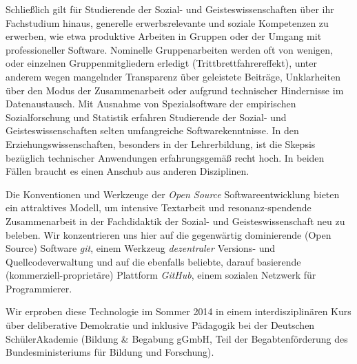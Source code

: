 \documentclass
	[
		11pt,
		a4paper,
		oneside,
		ngerman
	]
	{article}
\begin{document}
Schließlich gilt für Studierende der Sozial- und Geisteswissenschaften über ihr Fachstudium hinaus, generelle erwerbsrelevante und soziale Kompetenzen zu erwerben, wie etwa produktive Arbeiten in Gruppen oder der Umgang mit professioneller Software.
Nominelle Gruppenarbeiten werden oft von wenigen, oder einzelnen Gruppenmitgliedern erledigt (Trittbrettfahrereffekt), unter anderem wegen mangelnder Transparenz über geleistete Beiträge, Unklarheiten über den Modus der Zusammenarbeit oder aufgrund technischer Hindernisse im Datenaustausch.
Mit Ausnahme von Spezialsoftware der empirischen Sozialforschung und Statistik erfahren Studierende der Sozial- und Geisteswissenschaften selten umfangreiche Softwarekenntnisse.
In den Erziehungswissenschaften, besonders in der Lehrerbildung, ist die Skepsis bezüglich technischer Anwendungen erfahrungsgemäß recht hoch.
In beiden Fällen braucht es einen Anschub aus anderen Disziplinen.

Die Konventionen und Werkzeuge der \emph{Open Source} Softwareentwicklung bieten ein attraktives Modell, um intensive Textarbeit und resonanz-spendende Zusammenarbeit in der Fachdidaktik der Sozial- und Geisteswissenschaft neu zu beleben.
Wir konzentrieren uns hier auf die gegenwärtig dominierende (Open Source) Software \emph{git}, einem Werkzeug \emph{dezentraler} Versions- und Quellcodeverwaltung und auf die ebenfalls beliebte, darauf basierende (kommerziell-proprietäre) Plattform \emph{GitHub}, einem sozialen Netzwerk für Programmierer.

Wir erproben diese Technologie im Sommer 2014 in einem interdisziplinären Kurs über deliberative Demokratie und inklusive Pädagogik bei der Deutschen SchülerAkademie (Bildung \& Begabung gGmbH, Teil der Begabtenförderung des Bundesministeriums für Bildung und Forschung).
\end{document}
